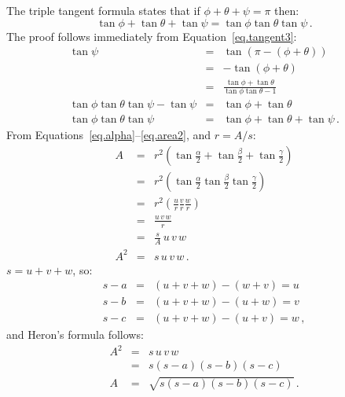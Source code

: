 The triple tangent formula states that if $\phi+\theta+\psi=\pi$ then:
\begin{equation}
\tan\phi+\tan\theta+\tan\psi = \tan\phi\tan\theta\tan\psi\,. \label{eq.triple}
\end{equation}
The proof follows immediately from Equation~\ref{eq.tangent3}:
\begin{eqnarray*}
\tan\psi &=& \tan (\pi-(\phi+\theta))\\
&=& -\tan (\phi+\theta)\\
&=& \frac{\tan\phi+\tan\theta}{\tan\phi\tan\theta-1}\\
\tan\phi\tan\theta\tan\psi-\tan\psi&=& \tan\phi+\tan\theta\\
\tan\phi\tan\theta\tan\psi &=&\tan\phi+\tan\theta+\tan\psi\,.
\end{eqnarray*}
From Equations~\ref{eq.alpha}--\ref{eq.area2}, and $r=A/s$:
\begin{eqnarray*}
A &=& r^2\left(\tan \frac{\alpha}{2}+\tan \frac{\beta}{2}+\tan \frac{\gamma}{2}\right)\\
&=&r^2\left(\tan \frac{\alpha}{2}\tan \frac{\beta}{2}\tan \frac{\gamma}{2}\right)\\
&=&r^2\left(\frac{u}{r}\frac{v}{r}\frac{w}{r}\right)\\
&=&\frac{u\,v\,w}{r}\\
&=&\frac{s}{A}\,u\,v\,w\\
A^2&=&s\,u\,v\,w\,.
\end{eqnarray*}
$s=u+v+w$, so:
\begin{eqnarray*}
s - a &=& (u+v+w) - (w+v) = u\\
s - b &=& (u+v+w) - (u+w) = v\\
s - c &=& (u+v+w) - (u+v) = w\,,
\end{eqnarray*}
and Heron's formula follows:
\begin{eqnarray*}
A^2 &=& s\,u\,v\,w\\
&=& s(s-a)(s-b)(s-c)\\
A &=& \sqrt{s(s-a)(s-b)(s-c)}\,.
\end{eqnarray*}


